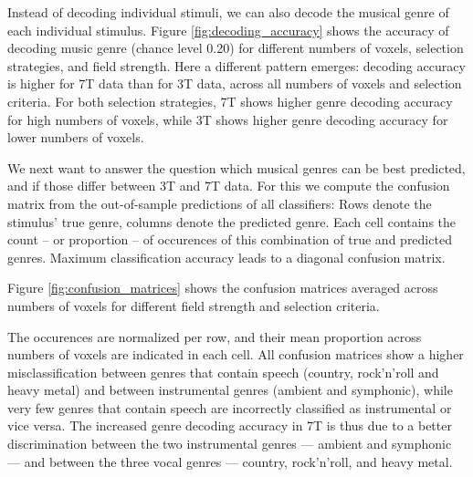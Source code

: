 Instead of decoding individual stimuli, we can also decode the musical genre of
each individual stimulus.
Figure \ref{fig:decoding_accuracy} shows the accuracy of decoding music genre
(chance level 0.20) for different numbers of voxels, selection strategies,
and field strength.
Here a different pattern emerges: decoding accuracy is higher for 7T data than for
3T data, across all numbers of voxels and selection criteria.
For both selection strategies, 7T shows higher genre decoding accuracy for high
numbers of voxels, while 3T shows higher genre decoding accuracy for lower
numbers of voxels.

We next want to answer the question which musical genres can be best predicted,
and if those differ between 3T and 7T data.
For this we compute the confusion matrix from the out-of-sample predictions of
all classifiers: Rows denote the stimulus' true genre, columns denote the
predicted genre. Each cell contains the count -- or proportion
-- of occurences of this combination of true and predicted genres.
Maximum classification accuracy leads to a diagonal confusion matrix.

Figure \ref{fig:confusion_matrices} shows the confusion matrices averaged across
numbers of voxels for different field strength and selection criteria.

The occurences are normalized per row, and their mean proportion across numbers
of voxels are indicated in each cell. All confusion matrices show a higher
misclassification between genres that contain speech (country, rock'n'roll and heavy metal)
and between instrumental genres (ambient and symphonic), while very few genres that contain speech are
incorrectly classified as instrumental or vice versa.
The increased genre decoding accuracy in 7T is thus due to a better
discrimination between the two instrumental genres --- ambient and symphonic ---
and between the three vocal genres --- country, rock'n'roll, and heavy metal.

%  
%	
%
%
%  
%	
%
%
%  
%	
%
%
